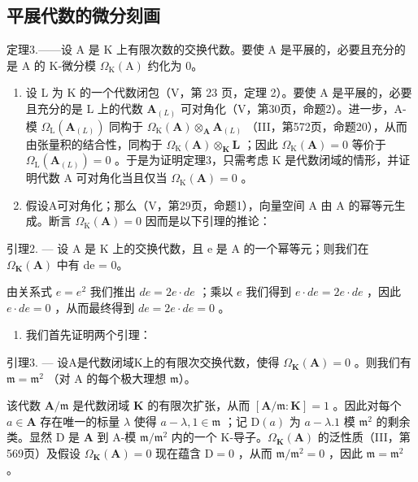 \subsection{平展代数的微分刻画}

定理3.——设 A 是 K 上有限次数的交换代数。要使 A 是平展的，必要且充分的是 A 的 K-微分模 \(\Omega_{\mathrm{K}}(\mathrm{A})\) 约化为 0。

\begin{enumerate}
\def\labelenumi{\Alph{enumi})}
\item
  设 L 为 K 的一个代数闭包（V，第 23 页，定理 2）。要使 A 是平展的，必要且充分的是 L 上的代数 \(\mathbf{A}_{(L)}\) 可对角化（V，第30页，命题2）。进一步，A-模 \(\Omega_{\mathrm{L}}(\mathbf{A}_{(L)})\) 同构于 \(\Omega_{\mathrm{K}}(\mathbf{A}) \otimes_{\mathbf{A}} \mathbf{A}_{(L)}\) （III，第572页，命题20），从而由张量积的结合性，同构于 \(\Omega_{\mathrm{K}}(\mathbf{A}) \otimes_{\mathbf{K}} \mathbf{L}\) ；因此 \(\Omega_{\mathrm{K}}(\mathbf{A}) = 0\) 等价于 \(\Omega_{\mathrm{L}}(\mathbf{A}_{(L)}) = 0\) 。于是为证明定理3，只需考虑 K 是代数闭域的情形，并证明代数 A 可对角化当且仅当 \(\Omega_{\mathrm{K}}(\mathbf{A}) = 0\) 。
\item
  假设A可对角化；那么（V，第29页，命题1），向量空间 A 由 A 的幂等元生成。断言 \(\Omega_{\mathrm{K}}(\mathbf{A}) = 0\) 因而是以下引理的推论：
\end{enumerate}

引理2. --- 设 A 是 K 上的交换代数，且 e 是 A 的一个幂等元；则我们在 \(\Omega_{\mathbf{K}}(\mathbf{A})\) 中有 de = 0。

由关系式 \(e = e^2\) 我们推出 \(de = 2e \cdot de\) ；乘以 \(e\) 我们得到 \(e \cdot de = 2e \cdot de\) ，因此 \(e \cdot de = 0\) ，从而最终得到 \(de = 2e \cdot de = 0\) 。

\begin{enumerate}
\def\labelenumi{\Alph{enumi})}
\setcounter{enumi}{2}
\tightlist
\item
  我们首先证明两个引理：
\end{enumerate}

引理3. --- 设A是代数闭域K上的有限次交换代数，使得 \(\Omega_{\mathbf{K}}(\mathbf{A}) = 0\) 。则我们有 \(\mathfrak{m} = \mathfrak{m}^2\) （对 A 的每个极大理想 \(\mathfrak{m}\)）。

该代数 \(\mathbf{A} / \mathfrak{m}\) 是代数闭域 \(\mathbf{K}\) 的有限次扩张，从而 \([\mathbf{A} / \mathfrak{m}:\mathbf{K}] = 1\) 。因此对每个 \(a\in \mathbf{A}\) 存在唯一的标量 \(\lambda\) 使得 \(a - \lambda ,1\in \mathfrak{m}\) ；记 \(\mathrm{D}(a)\) 为 \(a - \lambda .1\) 模 \(\mathfrak{m}^2\) 的剩余类。显然 \(\mathrm{D}\) 是 \(\mathbf{A}\) 到 A-模 \(\mathfrak{m} / \mathfrak{m}^2\) 内的一个 K-导子。\(\Omega_{\mathbf{K}}(\mathbf{A})\) 的泛性质（III，第569页）及假设 \(\Omega_{\mathbf{K}}(\mathbf{A}) = 0\) 现在蕴含 \(\mathrm{D} = 0\) ，从而 \(\mathfrak{m} / \mathfrak{m}^2 = 0\) ，因此 \(\mathfrak{m} = \mathfrak{m}^2\) 。

